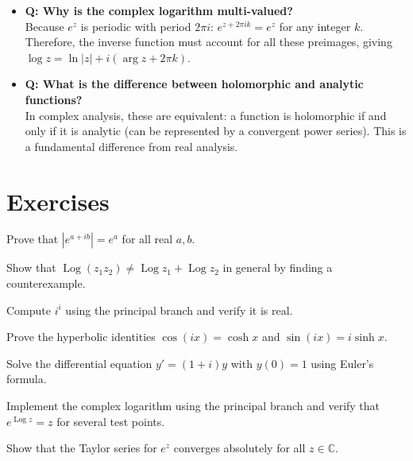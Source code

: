 \begin{itemize}
\item \textbf{Q: Why is the complex logarithm multi-valued?} \\
Because $e^z$ is periodic with period $2\pi i$: $e^{z+2\pi i k} = e^z$ for any integer $k$. Therefore, the inverse function must account for all these preimages, giving $\log z = \ln|z| + i(\arg z + 2\pi k)$.

\item \textbf{Q: What is the difference between holomorphic and analytic functions?} \\
In complex analysis, these are equivalent: a function is holomorphic if and only if it is analytic (can be represented by a convergent power series). This is a fundamental difference from real analysis.
\end{itemize}

\section{Exercises}

\begin{exercise}
Prove that $|e^{a+ib}| = e^a$ for all real $a, b$.
\end{exercise}

\begin{exercise}
Show that $\operatorname{Log}(z_1 z_2) \neq \operatorname{Log} z_1 + \operatorname{Log} z_2$ in general by finding a counterexample.
\end{exercise}

\begin{exercise}
Compute $i^i$ using the principal branch and verify it is real.
\end{exercise}

\begin{exercise}[Proof]
Prove the hyperbolic identities $\cos(ix) = \cosh x$ and $\sin(ix) = i\sinh x$.
\end{exercise}

\begin{exercise}
Solve the differential equation $y' = (1+i)y$ with $y(0) = 1$ using Euler's formula.
\end{exercise}

\begin{exercise}[Computational]
Implement the complex logarithm using the principal branch and verify that $e^{\operatorname{Log} z} = z$ for several test points.
\end{exercise}

\begin{exercise}
Show that the Taylor series for $e^z$ converges absolutely for all $z \in \mathbb{C}$.
\end{exercise}

